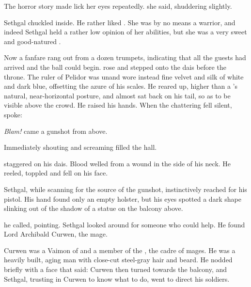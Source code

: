 The horror story made \Tiroco lick her eyes repeatedly. 
 she said, shuddering slightly.

Sethgal chuckled inside. 
He rather liked \Tiroco. 
She was by no means a warrior, and indeed Sethgal held a rather low opinion of her abilities, but she was a very sweet and good-natured \scatha. 

Now a fanfare rang out from a dozen trumpets, indicating that all the guests had arrived and the ball could begin. 
\Rayuth[\Icor] rose and stepped onto the dais before the throne. 
The ruler of Pelidor was un\armoured and wore instead fine velvet and silk of white and dark blue, offsetting the azure of his scales. 
He reared up, higher than a \scatha's natural, near-horizontal posture, and almost sat back on his tail, so as to be visible above the crowd.
He raised his hands. 
When the chattering fell silent, \Icor spoke: 


\emph{Blam!} came a gunshot from above. 

Immediately shouting and screaming filled the hall. 

\Icor staggered on his dais. 
Blood welled from a wound in the side of his neck. 
He reeled, toppled and fell on his face. 

Sethgal, while scanning for the source of the gunshot, instinctively reached for his pistol. 
His hand found only an empty holster, but his eyes spotted a dark shape slinking out of the shadow of a statue on the balcony above. 

 he called, pointing. 
Sethgal looked around for someone who could help. 
He found Lord Archibald Curwen, the \ishrah mage. 

Curwen was a Vaimon of \ClanTelcra and a member of the \ishrah, the cadre of mages. 
He was a heavily built, aging \human man with close-cut steel-gray hair and beard. 
He nodded briefly with a face that said:
Curwen then turned towards the balcony, and Sethgal, trusting in Curwen to know what to do, went to direct his soldiers. 

